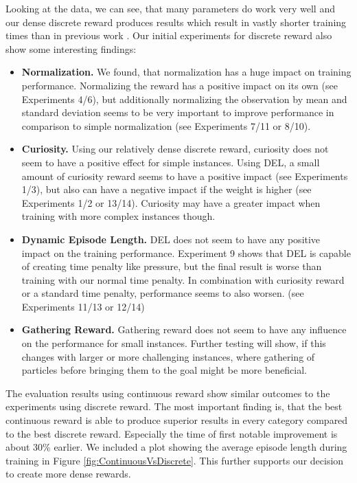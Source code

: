 Looking at the data, we can see, that many parameters do work very well and our dense discrete reward produces results which result in vastly shorter training times than in previous work \cite{huang2019}. Our initial experiments for discrete reward also show some interesting findings: 
\begin{itemize}
    \item \textbf{Normalization. } We found, that normalization has a huge impact on training performance. Normalizing the reward has a positive impact on its own (see Experiments 4/6), but additionally normalizing the observation by mean and standard deviation seems to be very important to improve performance in comparison to simple normalization (see Experiments 7/11 or 8/10).
    \item \textbf{Curiosity. } Using our relatively dense discrete reward, curiosity does not seem to have a positive effect for simple instances. Using DEL, a small amount of curiosity reward seems to have a positive impact (see Experiments 1/3), but also can have a negative impact if the weight is higher (see Experiments 1/2 or 13/14). Curiosity may have a greater impact when training with more complex instances though.
    \item \textbf{Dynamic Episode Length. } DEL does not seem to have any positive impact on the training performance. Experiment 9 shows that DEL is capable of creating time penalty like pressure, but the final result is worse than training with our normal time penalty. In combination with curiosity reward or a standard time penalty, performance seems to also worsen. (see Experiments 11/13 or 12/14)
    \item \textbf{Gathering Reward. } Gathering reward does not seem to have any influence on the performance for small instances. Further testing will show, if this changes with larger or more challenging instances, where gathering of particles before bringing them to the goal might be more beneficial.
\end{itemize}



The evaluation results using continuous reward show similar outcomes to the experiments using discrete reward. The most important finding is, that the best continuous reward is able to produce superior results in every category compared to the best discrete reward. Especially the time of first notable improvement is about 30\% earlier. We included a plot showing the average episode length during training in Figure \ref{fig:ContinuousVsDiscrete}. This further supports our decision to create more dense rewards. 

